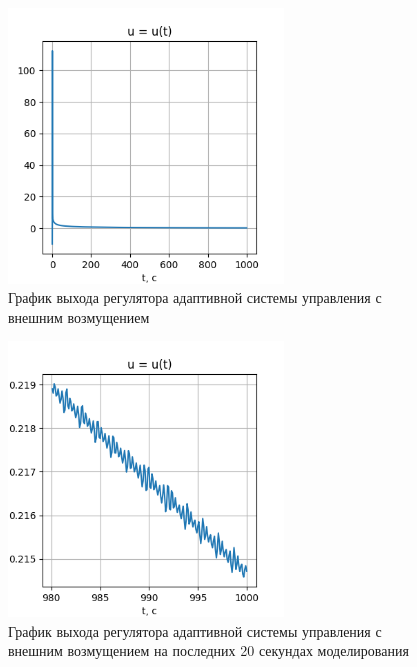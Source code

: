 \documentclass{article}
\begin{document}
\begin{figure}[h!]
  \centering
  \includegraphics[width=0.65\textwidth]{figs/1_u.png}
  \caption{График выхода регулятора адаптивной системы управления с внешним возмущением} 
  \label{fig:1_u}
\end{figure}

\begin{figure}[h!]
  \centering
  \includegraphics[width=0.65\textwidth]{figs/1_u_small.png}
  \caption{График выхода регулятора адаптивной системы управления с внешним возмущением на последних 20 секундах моделирования} 
  \label{fig:1_u_small}
\end{figure}
\end{document}
